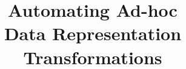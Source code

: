 \documentclass[runningheads,a4paper]{style/llncs}
\begin{document}
\mainmatter
\title{Automating Ad-hoc \\Data Representation Transformations}
\author{}
\institute{}
\maketitle


% 










\end{document}
